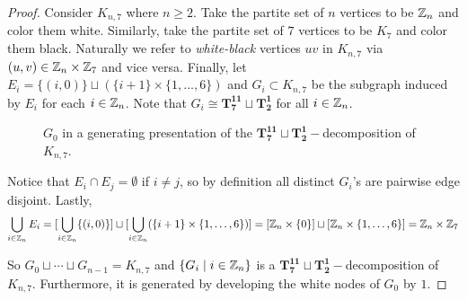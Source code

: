 \begin{proof}
    Consider $K_{n,7}$ where $n\geq 2$. Take the partite set of $n$ vertices to be $\mathbb{Z}_{n}$ and color them white. Similarly, take the partite set of $7$ vertices to be $K_{7}$ and color them black. Naturally we refer to \textit{white-black} vertices $uv$ in $K_{n,7}$ via $(u,v)\in \mathbb{Z}_{n}\times\mathbb{Z}_{7}$ and vice versa. Finally, let $E_{i}=\{(i,0)\}\sqcup (\{i+1\}\times \{1,\hdots,6\})$ and $G_{i}\subset K_{n,7}$ be the subgraph induced by $E_{i}$ for each $i\in \mathbb{Z}_{n}$. Note that $G_{i}\cong \mathbf{T_{7}^{11}}\sqcup\mathbf{T_{2}^{1}}$ for all $i\in \mathbb{Z}_{n}$.

    \begin{figure}[H]
        \centering
        
        \caption{$G_{0}$ in a generating presentation of the $\mathbf{T_{7}^{11}}\sqcup\mathbf{T_{2}^{1}}-$decomposition of $K_{n,7}$.}
        \label{fig:enter-label}
    \end{figure}

    \noindent Notice that $E_{i}\cap E_{j}=\emptyset$ if $i\neq j$, so by definition all distinct $G_{i}$'s are pairwise edge disjoint. Lastly,
    $$\bigcup_{i\in \mathbb{Z}_{n}} E_{i}=[\bigcup_{i\in \mathbb{Z}_{n}} \{(i,0)\}]\sqcup [\bigcup_{i\in \mathbb{Z}_{n}} (\{i+1\}\times \{1,\hdots, 6\})]=[\mathbb{Z}_{n}\times \{0\}]\sqcup [\mathbb{Z}_{n}\times \{1,\hdots, 6\}]=\mathbb{Z}_{n}\times \mathbb{Z}_{7}$$
    
    \noindent So $G_{0}\sqcup \cdots \sqcup G_{n-1}=K_{n,7}$ and $\{G_{i}\mid i\in \mathbb{Z}_{n}\}$ is a $\mathbf{T_{7}^{11}}\sqcup\mathbf{T_{2}^{1}}-$decomposition of $K_{n,7}$. Furthermore, it is generated by developing the white nodes of $G_{0}$ by $1$.
\end{proof}




